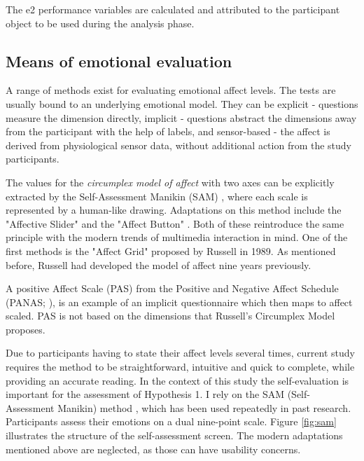 		The e2 performance variables are calculated and attributed to the participant object to be used during the analysis phase.
		

	\subsection{Means of emotional evaluation} \label{sec:selfeval}
%	


	
	A range of methods exist for evaluating emotional affect levels. The tests are usually bound to an underlying emotional model. They can be explicit - questions measure the dimension directly, implicit - questions abstract the dimensions away from the participant with the help of labels, and sensor-based - the affect is derived from physiological sensor data, without additional action from the study participants.
	
	The values for the \textit{circumplex model of affect} with two axes can be explicitly extracted by the Self-Assessment Manikin (SAM) \cite{Bradley1994}, where each scale is represented by a human-like drawing. Adaptations on this method include the "Affective Slider" \cite{Betella2016} and the "Affect Button" \cite{Broekens2009}. Both of these reintroduce the same principle with the modern trends of multimedia interaction in mind. One of the first methods is  the "Affect Grid" \cite{Russell1989} proposed by Russell in 1989. As mentioned before, Russell had developed the model of affect nine years previously.

	A positive Affect Scale (PAS) from the Positive and Negative Affect Schedule (PANAS; \cite{Watson1988}), is an example of an implicit questionnaire which then maps to affect scaled. PAS is not based on the dimensions that Russell's Circumplex Model proposes.
	
	Due to participants having to state their affect levels several times, current study requires the method to be straightforward, intuitive and quick to complete, while providing an accurate reading. In the context of this study the self-evaluation is important for the assessment of Hypothesis 1. I rely on the SAM (Self-Assessment Manikin) method \cite{Bradley1994}, which has been used repeatedly in past research. Participants assess their emotions on a dual nine-point scale. Figure \ref{fig:sam} illustrates the structure of the self-assessment screen. The modern adaptations mentioned above are neglected, as those can have usability concerns.
	
